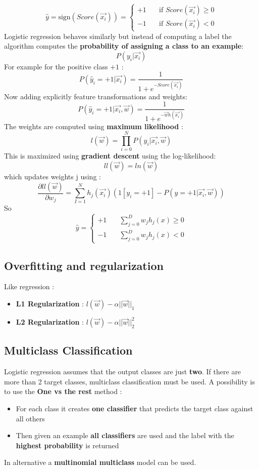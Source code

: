 \[ \hat{y} = \text{sign}(Score(\overrightarrow{x_i})) =
  \begin{cases}
    +1       & \quad \text{if } Score(\overrightarrow{x_i}) \geq 0 \\
    -1  & \quad \text{if } Score(\overrightarrow{x_i}) < 0
  \end{cases}
\]
Logistic regression behaves similarly but instead of computing a label the algorithm computes the \textbf{probability of assigning a class to an example}:
$$ P(y_i | \overrightarrow{x_i})$$
For example for the positive class $+1$ : 
$$ P(\hat{y}_i = +1|\overrightarrow{x_i})= \frac{1}{1+e^{-Score(\overrightarrow{x_i})}}$$
Now adding explicitly feature transformations and weights:
$$ P(\hat{y}_i = +1|\overrightarrow{x_i},\overrightarrow{w})= \frac{1}{1+e^{-\overrightarrow{w}h(\overrightarrow{x_i})}}$$
The weights are computed using \textbf{maximum likelihood} :
$$ l(\overrightarrow{w}) = \prod \limits_{i=0}^{N} P(y_i|\overrightarrow{x_i},\overrightarrow{w})$$
This is maximized using \textbf{gradient descent} using the log-likelihood:
$$ ll(\overrightarrow{w}) = ln (\overrightarrow{w})$$
which updates weights j using :
$$ \frac{\partial{ll(\overrightarrow{w})}}{\partial{w_j}}= \sum \limits_{I=1}^{N}h_j(\overrightarrow{x_i})\left( 1[y_i=+1]-P(y=+1|\overrightarrow{x_i},\overrightarrow{w})\right)$$
So 
\[ \hat{y} =
  \begin{cases}
    +1       & \quad \sum \limits_{j=0}^{D}w_jh_j(x) \geq 0 \\
    -1  & \quad \sum \limits_{j=0}^{D}w_jh_j(x) < 0 
  \end{cases}
\]

\subsection{Overfitting and regularization}
Like regression :
\begin{itemize}
\item \textbf{L1 Regularization } : $l(\overrightarrow{w}) - \alpha||\overrightarrow{w}||_1$
\item \textbf{L2 Regularization} : $l(\overrightarrow{w})- \alpha||\overrightarrow{w}||^2_2$
\end{itemize}

\subsection{Multiclass Classification}
Logistic regression assumes that the output classes are just \textbf{two}. If there are more than 2 target classes, multiclass classification must be used.
A possibility is to use the \textbf{One vs the rest } method :
\begin{itemize}
\item For each class it creates \textbf{one classifier} that predicts the target class against all others
\item Then given an example \textbf{all classifiers} are used and the label with the \textbf{highest probability} is returned
\end{itemize}
In alternative a \textbf{multinomial multiclass} model can be used.


